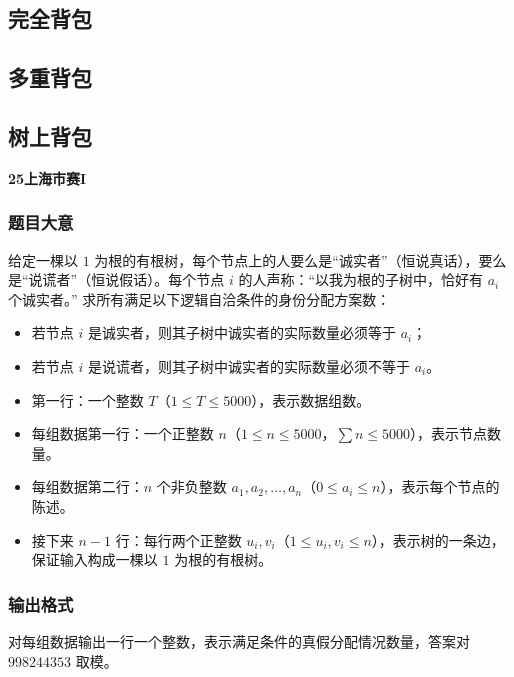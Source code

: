 \documentclass[11pt,a4paper,twocolumn]{ctexart}  %
\begin{document}


\subsection{完全背包}

\subsection{多重背包}


\subsection{树上背包}

\textbf{25上海市赛I}

\subsubsection*{题目大意}
给定一棵以 $1$ 为根的有根树，每个节点上的人要么是“诚实者”（恒说真话），要么是“说谎者”（恒说假话）。每个节点 $i$ 的人声称：“以我为根的子树中，恰好有 $a_i$ 个诚实者。”
求所有满足以下逻辑自洽条件的身份分配方案数：
\begin{itemize}
    \item 若节点 $i$ 是诚实者，则其子树中诚实者的实际数量必须等于 $a_i$；
    \item 若节点 $i$ 是说谎者，则其子树中诚实者的实际数量必须不等于 $a_i$。
\end{itemize}

\begin{itemize}
    \item 第一行：一个整数 $T$（$1 \le T \le 5000$），表示数据组数。
    \item 每组数据第一行：一个正整数 $n$（$1 \le n \le 5000$，$\sum n \le 5000$），表示节点数量。
    \item 每组数据第二行：$n$ 个非负整数 $a_1, a_2, \dots, a_n$（$0 \le a_i \le n$），表示每个节点的陈述。
    \item 接下来 $n-1$ 行：每行两个正整数 $u_i, v_i$（$1 \le u_i, v_i \le n$），表示树的一条边，保证输入构成一棵以 $1$ 为根的有根树。
\end{itemize}

\subsubsection*{输出格式}
对每组数据输出一行一个整数，表示满足条件的真假分配情况数量，答案对 $998244353$ 取模。
\end{document}
